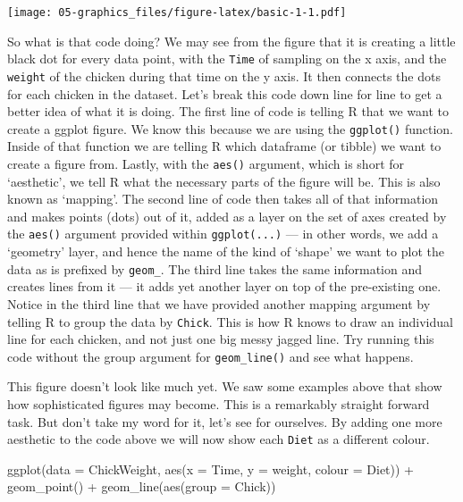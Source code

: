 \documentclass[
]{book}
\newenvironment{Shaded}{\begin{snugshade}}{\end{snugshade}}
\newcommand{\AttributeTok}[1]{\textcolor[rgb]{0.77,0.63,0.00}{#1}}
\newcommand{\FunctionTok}[1]{\textcolor[rgb]{0.00,0.00,0.00}{#1}}
\newcommand{\NormalTok}[1]{#1}
\newcommand{\SpecialCharTok}[1]{\textcolor[rgb]{0.00,0.00,0.00}{#1}}
\begin{document}
\texttt{[image: 05-graphics\_files/figure-latex/basic-1-1.pdf]}

So what is that code doing? We may see from the figure that it is creating a little black dot for every data point, with the \texttt{Time} of sampling on the x axis, and the \texttt{weight} of the chicken during that time on the y axis. It then connects the dots for each chicken in the dataset. Let's break this code down line for line to get a better idea of what it is doing. The first line of code is telling R that we want to create a ggplot figure. We know this because we are using the \texttt{ggplot()} function. Inside of that function we are telling R which dataframe (or tibble) we want to create a figure from. Lastly, with the \texttt{aes()} argument, which is short for `aesthetic', we tell R what the necessary parts of the figure will be. This is also known as `mapping'. The second line of code then takes all of that information and makes points (dots) out of it, added as a layer on the set of axes created by the \texttt{aes()} argument provided within \texttt{ggplot(...)} --- in other words, we add a `geometry' layer, and hence the name of the kind of `shape' we want to plot the data as is prefixed by \texttt{geom\_}. The third line takes the same information and creates lines from it --- it adds yet another layer on top of the pre-existing one. Notice in the third line that we have provided another mapping argument by telling R to group the data by \texttt{Chick}. This is how R knows to draw an individual line for each chicken, and not just one big messy jagged line. Try running this code without the group argument for \texttt{geom\_line()} and see what happens.

This figure doesn't look like much yet. We saw some examples above that show how sophisticated figures may become. This is a remarkably straight forward task. But don't take my word for it, let's see for ourselves. By adding one more aesthetic to the code above we will now show each \texttt{Diet} as a different colour.

\begin{Shaded}
\begin{Highlighting}[]
\FunctionTok{ggplot}\NormalTok{(}\AttributeTok{data =}\NormalTok{ ChickWeight, }\FunctionTok{aes}\NormalTok{(}\AttributeTok{x =}\NormalTok{ Time, }\AttributeTok{y =}\NormalTok{ weight, }\AttributeTok{colour =}\NormalTok{ Diet)) }\SpecialCharTok{+}
  \FunctionTok{geom\_point}\NormalTok{() }\SpecialCharTok{+}
  \FunctionTok{geom\_line}\NormalTok{(}\FunctionTok{aes}\NormalTok{(}\AttributeTok{group =}\NormalTok{ Chick))}
\end{Highlighting}
\end{Shaded}
\end{document}
